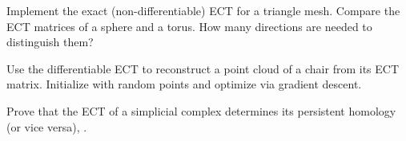 \begin{exercise}
Implement the exact (non-differentiable) ECT for a triangle mesh. Compare the ECT matrices of a sphere and a torus. How many directions are needed to distinguish them?
\end{exercise}

\begin{exercise}
Use the differentiable ECT to reconstruct a point cloud of a chair from its ECT matrix. Initialize with random points and optimize via gradient descent.
\end{exercise}

\begin{exercise}[Research]
Prove that the ECT of a simplicial complex determines its persistent homology (or vice versa), \cite{rieck2025topology}.
\end{exercise}